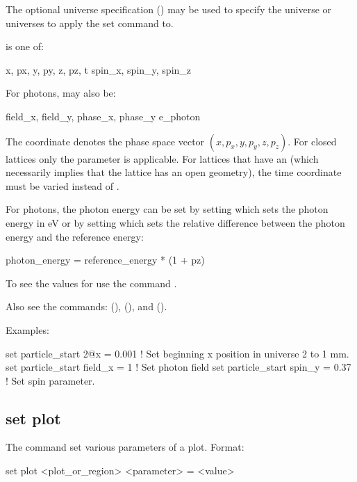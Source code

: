{{{The optional  universe specification () may be used to specify the universe
or universes to apply the set command to.

 is one of:
\begin{example}
  x, px, y, py, z, pz, t
  spin_x, spin_y, spin_z
\end{example}
For photons,  may also be:
\begin{example}
  field_x, field_y, phase_x, phase_y
  e_photon
\end{example}
The \vn{*} coordinate denotes the phase space vector $(x, p_x, y, p_y, z, p_z)$.  For closed
lattices only the  parameter is applicable. For lattices that have an  (which
necessarily implies that the lattice has an open geometry), the time  coordinate must be
varied instead of .

For photons, the photon energy can be set by setting  which sets the photon energy in
eV or by setting  which sets the relative difference between the photon energy and the
reference energy:
\begin{example}
  photon_energy = reference_energy * (1 + pz)
\end{example}

To see the values for  use the command .

Also see the commands:  (),  (), 
and  ().

Examples:
\begin{example}
  set particle_start 2@x = 0.001         ! Set beginning x position in universe 2 to 1 mm.
  set particle_start field_x = 1         ! Set photon field
  set particle_start spin_y = 0.37       ! Set spin parameter.
\end{example}


\subsection{set plot}
\label{s:set.plot}

The  command set various parameters of a plot. Format:
\begin{example}
  set plot <plot_or_region> <parameter> = <value>
\end{example}

}}}
